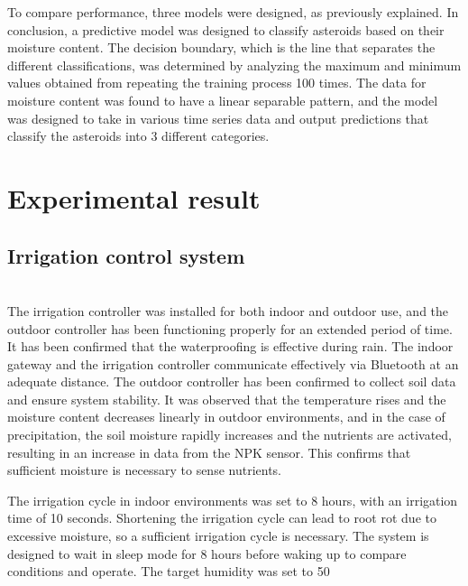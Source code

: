 \documentclass[11pt]{article}
\begin{document}
To compare performance, three models were designed, as previously explained. In conclusion, a predictive model was designed to classify asteroids based on their moisture content. The decision boundary, which is the line that separates the different classifications, was determined by analyzing the maximum and minimum values obtained from repeating the training process 100 times. The data for moisture content was found to have a linear separable pattern, and the model was designed to take in various time series data and output predictions that classify the asteroids into 3 different categories.

\section{Experimental result}
\subsection{Irrigation control system}
\indent \\The irrigation controller was installed for both indoor and outdoor use, and the outdoor controller has been functioning properly for an extended period of time. It has been confirmed that the waterproofing is effective during rain. The indoor gateway and the irrigation controller communicate effectively via Bluetooth at an adequate distance. The outdoor controller has been confirmed to collect soil data and ensure system stability. It was observed that the temperature rises and the moisture content decreases linearly in outdoor environments, and in the case of precipitation, the soil moisture rapidly increases and the nutrients are activated, resulting in an increase in data from the NPK sensor. This confirms that sufficient moisture is necessary to sense nutrients.

The irrigation cycle in indoor environments was set to 8 hours, with an irrigation time of 10 seconds. Shortening the irrigation cycle can lead to root rot due to excessive moisture, so a sufficient irrigation cycle is necessary. The system is designed to wait in sleep mode for 8 hours before waking up to compare conditions and operate. The target humidity was set to 50%
\end{document}
